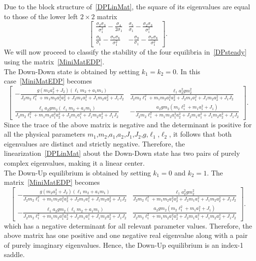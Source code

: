 \documentclass[11pt]{article}
\numberwithin{equation}{section}
\theoremstyle{plain}
\begin{document}
Due to the block structure of~\eqref{DPLinMat}, the square of its eigenvalues are equal to those of the lower left $2\times 2$ matrix 
\begin{equation}\label{MiniMatEDP}
	\begin{bmatrix}
		\frac{\sigma_2\sigma_3}{\sigma_1^2}-\frac{\sigma_4}{2\sigma_1} & \frac{\sigma_5}{\sigma_1}-\frac{\sigma_2\sigma_3}{\sigma_1^2} \\
		\frac{\sigma_6}{\sigma_1}-\frac{\sigma_7\sigma_8}{\sigma_1^2} & -\frac{\sigma_{9}}{\sigma_1}-\frac{\sigma_7\sigma_8}{\sigma_1^2}
	\end{bmatrix}.
\end{equation}
We will now proceed to classify the stability of the four equilibria in~\eqref{DPsteady} using the matrix~\eqref{MiniMatEDP}.\\

 The Down-Down state is obtained by setting $k_1 = k_2 = 0$. In this case~\eqref{MiniMatEDP} becomes
\begin{equation}
	\begin{bmatrix}
		-\frac{g(m_2a_2^2+J_2)(\ell_1m_2+a_1m_1)}{J_2m_2\ell_1^2+m_1m_2a_1^2a_2^2+J_2m_1a_1^2+J_1m_2a_2^2+J_1J_2} & \frac{\ell_1a_2^2gm_2^2}{J_2m_2\ell_1^2+m_1m_2a_1^2a_2^2+J_2m_1a_1^2+J_1m_2a_2^2+J_1J_2} \\
		\frac{\ell_1a_2gm_2(\ell_1m_2+a_1m_1)}{J_2m_2\ell_1^2+m_1m_2a_1^2a_2^2+J_2m_1a_1^2+J_1m_2a_2^2+J_1J_2} & -\frac{a_2gm_2(m_2\ell_1^2+m_1a_1^2+J_1)}{J_2m_2\ell_1^2+m_1m_2a_1^2a_2^2+J_2m_1a_1^2+J_1m_2a_2^2+J_1J_2}
	\end{bmatrix}.
\end{equation} 
Since the trace of the above matrix is negative and the determinant is positive for all the physical parameters $m_1$,$m_2$,$a_1$,$a_2$,$J_1$,$J_2$,$g$,$\ell_1$,$\ell_2$, it follows that both eigenvalues are distinct and strictly negative. Therefore, the linearization~\eqref{DPLinMat} about the Down-Down state has two pairs of purely complex eigenvalues, making it a linear center. \\

 The Down-Up equilibrium is obtained by setting $k_1 = 0$ and $k_2 = 1$. The matrix~\eqref{MiniMatEDP} becomes 
\begin{equation}
	\begin{bmatrix}
		-\frac{g(m_2a_2^2+J_2)(\ell_1m_2+a_1m_1)}{J_2m_2\ell_1^2+m_1m_2a_1^2a_2^2+J_2m_1a_1^2+J_1m_2a_2^2+J_1J_2} & \frac{\ell_1a_2^2gm_2^2}{J_2m_2\ell_1^2+m_1m_2a_1^2a_2^2+J_2m_1a_1^2+J_1m_2a_2^2+J_1J_2} \\
		-\frac{\ell_1a_2gm_2(\ell_1m_2+a_1m_1)}{J_2m_2\ell_1^2+m_1m_2a_1^2a_2^2+J_2m_1a_1^2+J_1m_2a_2^2+J_1J_2} & \frac{a_2gm_2(m_2\ell_1^2+m_1a_1^2+J_1)}{J_2m_2\ell_1^2+m_1m_2a_1^2a_2^2+J_2m_1a_1^2+J_1m_2a_2^2+J_1J_2}
	\end{bmatrix}.
\end{equation} 
which has a negative determinant for all relevant parameter values. Therefore, the above matrix has one positive and one negative real eigenvalue along with a pair of purely imaginary eigenvalues. Hence, the Down-Up equilibrium is an index-1 saddle.  \\
\end{document}
